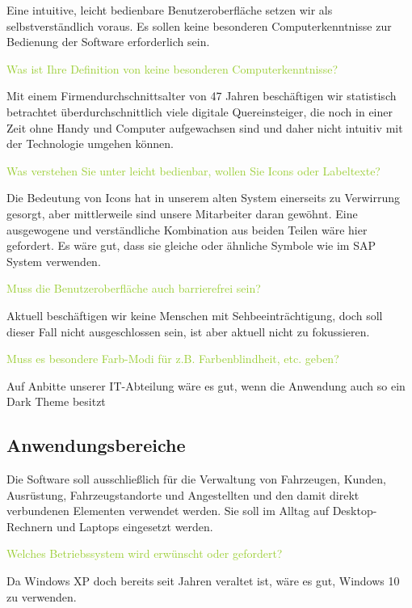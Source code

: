 Eine intuitive, leicht bedienbare Benutzeroberfläche setzen wir als selbstverständlich voraus. 
Es sollen keine besonderen Computerkenntnisse zur Bedienung der Software erforderlich sein.  

\textcolor{YellowGreen}{Was ist Ihre Definition von \grqq{}keine besonderen Computerkenntnisse\grqq{}?}

\textcolor{NavyBlue}{Mit einem Firmendurchschnittsalter von 47 Jahren beschäftigen wir statistisch betrachtet überdurchschnittlich viele digitale Quereinsteiger, die noch in einer Zeit ohne Handy und Computer aufgewachsen sind und daher nicht intuitiv mit der Technologie umgehen können. }

\textcolor{YellowGreen}{Was verstehen Sie unter leicht bedienbar, wollen Sie Icons oder Labeltexte?}

\textcolor{NavyBlue}{Die Bedeutung von Icons hat in unserem alten System einerseits zu Verwirrung gesorgt, aber mittlerweile sind unsere Mitarbeiter daran gewöhnt. Eine ausgewogene und verständliche Kombination aus beiden Teilen wäre hier gefordert. Es wäre gut, dass sie gleiche oder ähnliche Symbole wie im SAP System verwenden.}

\textcolor{YellowGreen}{Muss die Benutzeroberfläche auch barrierefrei sein?}

\textcolor{NavyBlue}{Aktuell beschäftigen wir keine Menschen mit Sehbeeinträchtigung, doch soll dieser Fall nicht ausgeschlossen sein, ist aber aktuell nicht zu fokussieren.}

\textcolor{YellowGreen}{Muss es besondere Farb-Modi für z.B. Farbenblindheit, etc. geben?}

\textcolor{NavyBlue}{Auf Anbitte unserer IT-Abteilung wäre es gut, wenn die Anwendung auch so ein \grqq{}Dark Theme\grqq{} besitzt}

\subsection{Anwendungsbereiche}

Die Software soll ausschließlich für die Verwaltung von Fahrzeugen, Kunden, Ausrüstung, Fahrzeugstandorte und Angestellten und den damit direkt verbundenen Elementen verwendet werden. 
Sie soll im Alltag auf Desktop-Rechnern und Laptops eingesetzt werden.  

\textcolor{YellowGreen}{Welches Betriebssystem wird erwünscht oder gefordert?}

\textcolor{NavyBlue}{Da Windows XP doch bereits seit Jahren veraltet ist, wäre es gut, Windows 10 zu verwenden.}

